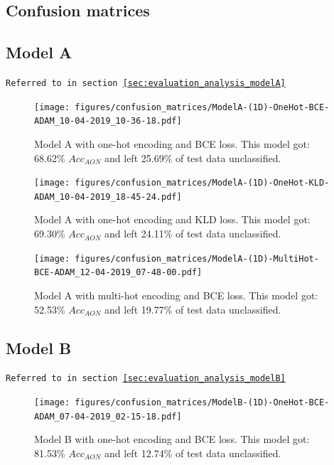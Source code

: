 \begin{appendices}
    \newpage
    \section{Confusion matrices}
        \subsection{Model A}
        \label{app:modelA_confusion_matrix}
        \texttt{Referred to in section \ref{sec:evaluation_analysis_modelA}}
            \begin{figure}[H]
                \centering
                \texttt{[image: figures/confusion\_matrices/ModelA-(1D)-OneHot-BCE-ADAM\_10-04-2019\_10-36-18.pdf]}
                \caption*{Model A with one-hot encoding and BCE loss. This model got:  68.62\% $Acc_{AON}$ and left 25.69\% of test data unclassified.}
            \end{figure}
            
            \begin{figure}[H]
                \centering
                \texttt{[image: figures/confusion\_matrices/ModelA-(1D)-OneHot-KLD-ADAM\_10-04-2019\_18-45-24.pdf]}
                \caption*{Model A with one-hot encoding and KLD loss. This model got:  69.30\% $Acc_{AON}$ and left 24.11\% of test data unclassified.}
            \end{figure}
            
            \begin{figure}[H]
                \centering
                \texttt{[image: figures/confusion\_matrices/ModelA-(1D)-MultiHot-BCE-ADAM\_12-04-2019\_07-48-00.pdf]}
                \caption*{Model A with multi-hot encoding and BCE loss. This model got:  52.53\% $Acc_{AON}$ and left 19.77\% of test data unclassified.}
            \end{figure}
            
        \newpage
        \subsection{Model B}
        \label{app:modelB_confusion_matrix}
        \texttt{Referred to in section \ref{sec:evaluation_analysis_modelB}}
            \begin{figure}[H]
                \centering
                \texttt{[image: figures/confusion\_matrices/ModelB-(1D)-OneHot-BCE-ADAM\_07-04-2019\_02-15-18.pdf]}
                \caption*{Model B with one-hot encoding and BCE loss. This model got:  81.53\% $Acc_{AON}$ and left 12.74\% of test data unclassified.}
            \end{figure}
            

\end{appendices}
